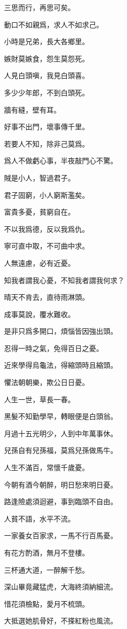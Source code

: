 \documentclass[12pt,a4paper]{ctexbook}
\begin{document}
三思而行，再思可矣。\par
動口不如親爲，求人不如求己。\par
小時是兄弟，長大各鄉里。\par
嫉財莫嫉食，怨生莫怨死。\par
人見白頭嗔，我見白頭喜。\par
多少少年郎，不到白頭死。\par
牆有縫，壁有耳。\par
好事不出門，壞事傳千里。\par
若要人不知，除非己莫爲。\par
爲人不做虧心事，半夜敲門心不驚。\par
賊是小人，智過君子。\par
君子固窮，小人窮斯濫矣。\par
富貴多憂，貧窮自在。\par
不以我爲德，反以我爲仇。\par
寧可直中取，不可曲中求。\par
人無遠慮，必有近憂。\par
知我者謂我心憂，不知我者謂我何求？\par
晴天不肯去，直待雨淋頭。\par
成事莫說，覆水難收。\par
是非只爲多開口，煩惱皆因強出頭。\par
忍得一時之氣，免得百日之憂。\par
近來學得烏龜法，得縮頭時且縮頭。\par
懼法朝朝樂，欺公日日憂。\par
人生一世，草長一春。\par
黑髮不知勤學早，轉眼便是白頭翁。\par
月過十五光明少，人到中年萬事休。\par
兒孫自有兒孫福，莫爲兒孫做馬牛。\par
人生不滿百，常懷千歲憂。\par
今朝有酒今朝醉，明日愁來明日憂。\par
路逢險處須迴避，事到臨頭不自由。\par
人貧不語，水平不流。\par
一家養女百家求，一馬不行百馬憂。\par
有花方酌酒，無月不登樓。\par
三杯通大道，一醉解千愁。\par
深山畢竟藏猛虎，大海終須納細流。\par
惜花須檢點，愛月不梳頭。\par
大抵選她肌骨好，不搽紅粉也風流。\par
\end{document}
